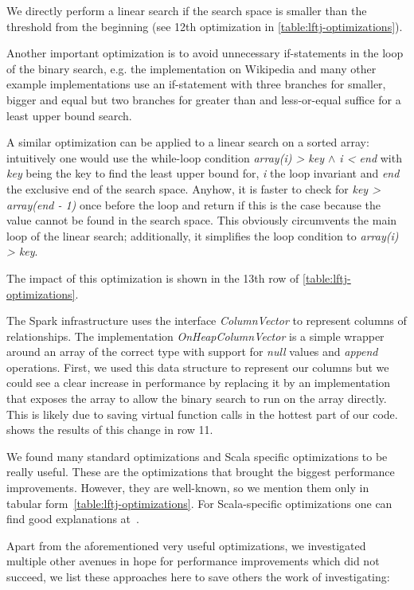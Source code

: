 We directly perform a linear search if the search space is smaller than the threshold from the beginning (see 12th optimization in
\cref{table:lftj-optimizations}).

Another important optimization is to avoid unnecessary if-statements in the loop of the binary
search, e.g. the implementation on Wikipedia and many other example implementations use an
if-statement with three branches for smaller, bigger and equal but two branches for greater than and less-or-equal suffice for a least upper bound search.

A similar optimization can be applied to a linear search on a sorted array: intuitively one would use the while-loop condition
\textit{array(i) > key $\wedge$ i < end} with \textit{key} being the key to find the least upper bound for, \textit{i} the loop invariant
and \textit{end} the exclusive end of the search space.
Anyhow, it is faster to check for \textit{key > array(end - 1)} once before the loop and return if this is the case because the value
cannot be found in the search space.
This obviously circumvents the main loop of the linear search;
additionally, it simplifies the loop condition to \textit{array(i) > key}.

The impact of this optimization is shown in the 13th row of \cref{table:lftj-optimizations}.

The Spark infrastructure uses the interface \textit{ColumnVector} to represent columns of relationships.
The implementation \textit{OnHeapColumnVector} is a simple wrapper around an array of the correct type with support for \textit{null} values and \textit{append} operations.
First, we used this data structure to represent our columns but we could see a clear increase in performance by replacing it by an implementation that exposes the array
to allow the binary search to run on the array directly.
This is likely due to saving virtual function calls in the hottest part of our code.
 shows the results of this change in row 11.

We found many standard optimizations and Scala specific optimizations to be really useful.
These are the optimizations that brought the biggest performance improvements.
However, they are well-known, so we mention them only in tabular form~\ref{table:lftj-optimizations}.
For Scala-specific optimizations one can find good explanations at~\cite{databricks-scala-guide}.

Apart from the aforementioned very useful optimizations, we investigated multiple other avenues in hope for performance improvements
which did not succeed, we list these approaches here to save others the work of investigating:

